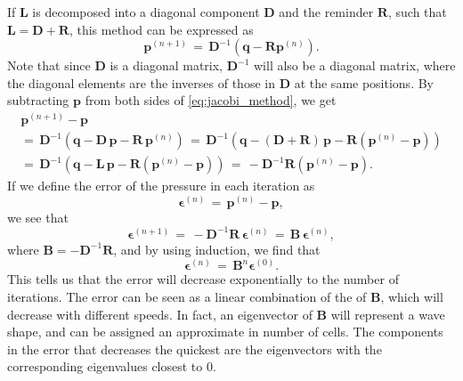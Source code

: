 If $\mathbf{L}$ is decomposed into a diagonal component $\mathbf{D}$ and the reminder $\mathbf{R}$, such that $\mathbf{L} = \mathbf{D} + \mathbf{R}$, this method can be expressed as
%
\begin{equation} \label{eq:jacobi_method}
\mathbf{p}^{(n+1)} \,=\, \mathbf{D}^{-1}(\mathbf{q} - \mathbf{R}\mathbf{p}^{(n)}).
\end{equation}
%
Note that since $\mathbf{D}$ is a diagonal matrix, $\mathbf{D}^{-1}$ will also be a diagonal matrix, where the diagonal elements are the inverses of those in $\mathbf{D}$ at the same positions. By subtracting $\mathbf{p}$ from both sides of \eqref{eq:jacobi_method}, we get
%
\begin{equation}
\renewcommand*{\arraystretch}{1.5}
\begin{array}{c}
\mathbf{p}^{(n+1)} - \mathbf{p} \\
=\, \mathbf{D}^{-1}(\mathbf{q} - \mathbf{D}\,\mathbf{p} - \mathbf{R}\,\mathbf{p}^{(n)}) \,=\, \mathbf{D}^{-1}(\mathbf{q} - (\mathbf{D} + \mathbf{R})\,\mathbf{p} - \mathbf{R}(\mathbf{p}^{(n)} - \mathbf{p})) \\
=\, \mathbf{D}^{-1}(\mathbf{q} - \mathbf{L}\,\mathbf{p} - \mathbf{R}(\mathbf{p}^{(n)} - \mathbf{p})) \,=\, -\mathbf{D}^{-1}\mathbf{R}(\mathbf{p}^{(n)} - \mathbf{p}).
\end{array}
\end{equation}
%
If we define the error of the pressure in each iteration as
%
\begin{equation} \label{eq:pressure_error}
\mathbf{\epsilon}^{(n)} \,=\, \mathbf{p}^{(n)} - \mathbf{p},
\end{equation}
%
we see that
%
\begin{equation} \label{eq:jacobi_method_error}
\mathbf{\epsilon}^{(n+1)} \,=\, -\mathbf{D}^{-1}\mathbf{R}\,\mathbf{\epsilon}^{(n)} \,=\, \mathbf{B}\,\mathbf{\epsilon}^{(n)},
\end{equation}
%
where $\mathbf{B} = -\mathbf{D}^{-1}\mathbf{R}$, and by using induction, we find that
%
\begin{equation} \label{eq:jacobi_method_error_from_initial_error}
\mathbf{\epsilon}^{(n)} \,=\, \mathbf{B}^n\mathbf{\epsilon}^{(0)}.
\end{equation}
%
This tells us that the error will decrease exponentially to the number of iterations. The error can be seen as a linear combination of the \eigenvectors of $\mathbf{B}$, which will decrease with different speeds. In fact, an eigenvector of $\mathbf{B}$ will represent a wave shape, and can be assigned an approximate \wavelength in number of cells. The components in the error that decreases the quickest are the eigenvectors with the corresponding eigenvalues closest to 0.

